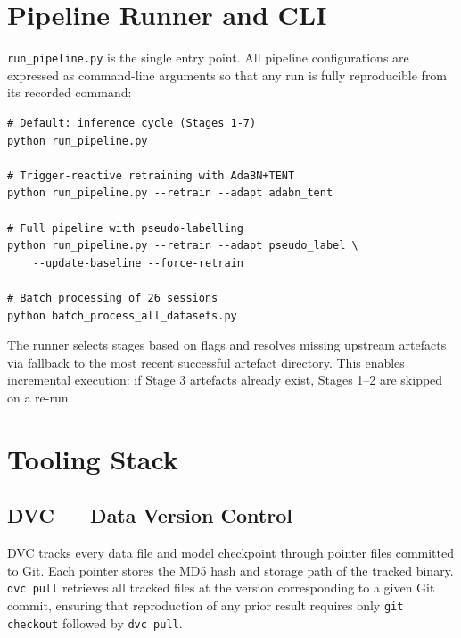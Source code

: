 \section{Pipeline Runner and CLI}
\label{sec:cli}

\texttt{run\_pipeline.py} is the single entry point.
All pipeline configurations are expressed as command-line arguments so that
any run is fully reproducible from its recorded command:

\begin{lstlisting}[caption={CLI usage examples.}]
# Default: inference cycle (Stages 1-7)
python run_pipeline.py

# Trigger-reactive retraining with AdaBN+TENT
python run_pipeline.py --retrain --adapt adabn_tent

# Full pipeline with pseudo-labelling
python run_pipeline.py --retrain --adapt pseudo_label \
    --update-baseline --force-retrain

# Batch processing of 26 sessions
python batch_process_all_datasets.py
\end{lstlisting}

The runner selects stages based on flags and resolves missing upstream
artefacts via fallback to the most recent successful artefact directory.
This enables incremental execution: if Stage 3 artefacts already exist,
Stages 1--2 are skipped on a re-run.

\section{Tooling Stack}
\label{sec:tooling}

\subsection{DVC — Data Version Control}

DVC \citep{dvcteam2020} tracks every data file and model checkpoint through
pointer files committed to Git.
Each pointer stores the MD5 hash and storage path of the tracked binary.
\texttt{dvc pull} retrieves all tracked files at the version corresponding to
a given Git commit, ensuring that reproduction of any prior result requires
only \texttt{git checkout} followed by \texttt{dvc pull}.

